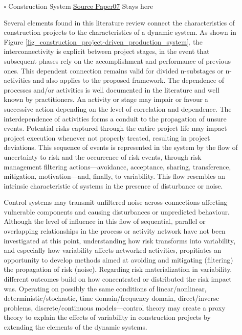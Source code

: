 \documentclass{article}
\begin{document}
\begin{itemize}
\item[{$\square$}] Construction System
\uline{Source Paper07} Stays here

Several elements found in this literature review connect the characteristics of construction projects to the characteristics of a dynamic system.
As shown in Figure \ref{fig_construction_project-driven_production_system}, the interconnectivity is explicit between project stages, in the event that subsequent phases rely on the accomplishment and performance of previous ones.
This dependent connection remains valid for divided n-substages or n-activities and also applies to the proposed framework.
The dependence of processes and/or activities is well documented in the literature and well known by practitioners.
An activity or stage may impair or favour a successive action depending on the level of correlation and dependence.
The interdependence of activities forms a conduit to the propagation of unsure events. Potential risks captured through the entire project life may impact project execution whenever not properly treated, resulting in project deviations.
This sequence of events is represented in the system by the flow of uncertainty to risk and the occurrence of risk events, through risk management filtering actions—avoidance, acceptance, sharing, transference, mitigation, motivation—and, finally, to variability.
This flow resembles an intrinsic characteristic of systems in the presence of disturbance or noise.

Control systems may transmit unfiltered noise across connections affecting vulnerable components and causing disturbances or unpredicted behaviour.
Although the level of influence in this flow of sequential, parallel or overlapping relationships in the process or activity network have not been investigated at this point, understanding how risk transforms into variability, and especially how variability affects networked activities, propitiates an opportunity to develop methods aimed at avoiding and mitigating (filtering) the propagation of risk (noise). Regarding risk materialization in variability, different outcomes build on how concentrated or distributed the risk impact was.
Operating on possibly the same conditions of linear/nonlinear, deterministic/stochastic, time-domain/frequency domain, direct/inverse problems, discrete/continuous models---control theory may create a proxy theory to explain the effects of variability in construction projects by extending the elements of the dynamic systems.
\end{itemize}
\end{document}
